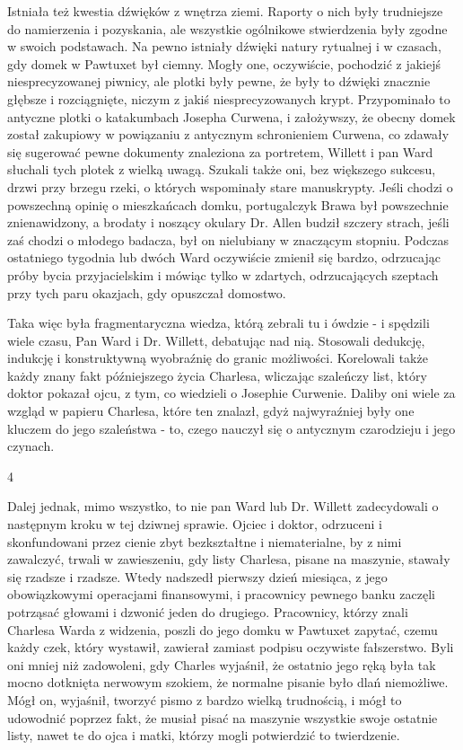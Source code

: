 Istniała też kwestia dźwięków z wnętrza ziemi. Raporty o nich były trudniejsze do namierzenia i pozyskania, ale wszystkie ogólnikowe stwierdzenia były zgodne w swoich podstawach. Na pewno istniały dźwięki natury rytualnej i w czasach, gdy domek w Pawtuxet był ciemny. Mogły one, oczywiście, pochodzić z jakiejś niesprecyzowanej piwnicy, ale plotki były pewne, że były to dźwięki znacznie głębsze i rozciągnięte, niczym z jakiś niesprecyzowanych krypt. Przypominało to antyczne plotki o katakumbach Josepha Curwena, i założywszy, że obecny domek został zakupiowy w powiązaniu z antycznym schronieniem Curwena, co zdawały się sugerować pewne dokumenty znaleziona za portretem, Willett i pan Ward słuchali tych plotek z wielką uwagą. Szukali także oni, bez większego sukcesu, drzwi przy brzegu rzeki, o których wspominały stare manuskrypty. Jeśli chodzi o powszechną opinię o mieszkańcach domku, portugalczyk Brawa był powszechnie znienawidzony, a brodaty i noszący okulary Dr. Allen budził szczery strach, jeśli zaś chodzi o młodego badacza, był on nielubiany w znaczącym stopniu. Podczas ostatniego tygodnia lub dwóch Ward oczywiście zmienił się bardzo, odrzucając próby bycia przyjacielskim i mówiąc tylko w zdartych, odrzucających szeptach przy tych paru okazjach, gdy opuszczał domostwo. 

Taka więc była fragmentaryczna wiedza, którą zebrali tu i ówdzie - i spędzili wiele czasu, Pan Ward i Dr. Willett, debatując nad nią. Stosowali dedukcję, indukcję i konstruktywną wyobraźnię do granic możliwości. Korelowali także każdy znany fakt późniejszego życia Charlesa, wliczając szaleńczy list, który doktor pokazał ojcu, z tym, co wiedzieli o Josephie Curwenie. Daliby oni wiele za wzgląd w papieru Charlesa, które ten znalazł, gdyż najwyraźniej były one kluczem do jego szaleństwa - to, czego nauczył się o antycznym czarodzieju i jego czynach.

\begin{center}
4
\end{center}

Dalej jednak, mimo wszystko, to nie pan Ward lub Dr. Willett zadecydowali o następnym kroku w tej dziwnej sprawie. Ojciec i doktor, odrzuceni i skonfundowani przez cienie zbyt bezkształtne i niematerialne, by z nimi zawalczyć, trwali w zawieszeniu, gdy listy Charlesa, pisane na maszynie, stawały się rzadsze i rzadsze. Wtedy nadszedł pierwszy dzień miesiąca, z jego obowiązkowymi operacjami finansowymi, i pracownicy pewnego banku zaczęli potrząsać głowami i dzwonić jeden do drugiego. Pracownicy, którzy znali Charlesa Warda z widzenia, poszli do jego domku w Pawtuxet zapytać, czemu każdy czek, który wystawił, zawierał zamiast podpisu oczywiste fałszerstwo. Byli oni mniej niż zadowoleni, gdy Charles wyjaśnił, że ostatnio jego ręką była tak mocno dotknięta nerwowym szokiem, że normalne pisanie było dlań niemożliwe. Mógł on, wyjaśnił, tworzyć pismo z bardzo wielką trudnością, i mógł to udowodnić poprzez fakt, że musiał pisać na maszynie wszystkie swoje ostatnie listy, nawet te do ojca i matki, którzy mogli potwierdzić to twierdzenie. 

